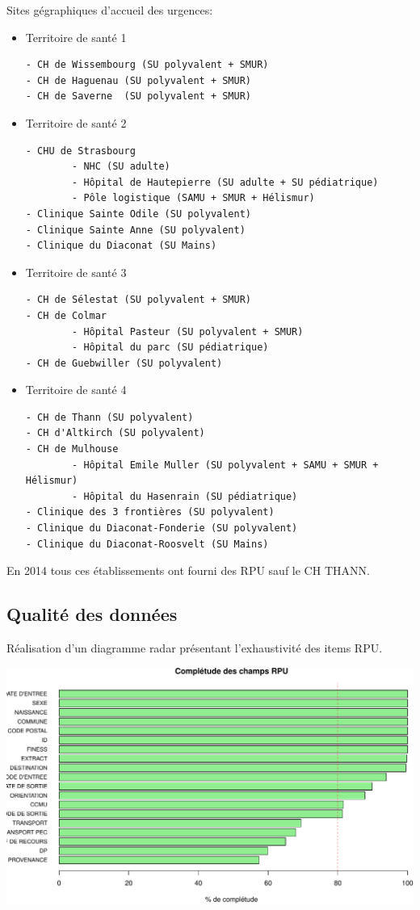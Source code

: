 \documentclass[]{article}
\begin{document}
Sites gégraphiques d'accueil des urgences:

\begin{itemize}
\item
  Territoire de santé 1

\begin{verbatim}
- CH de Wissembourg (SU polyvalent + SMUR)
- CH de Haguenau (SU polyvalent + SMUR)
- CH de Saverne  (SU polyvalent + SMUR)
\end{verbatim}
\item
  Territoire de santé 2

\begin{verbatim}
- CHU de Strasbourg
        - NHC (SU adulte)
        - Hôpital de Hautepierre (SU adulte + SU pédiatrique)
        - Pôle logistique (SAMU + SMUR + Hélismur)
- Clinique Sainte Odile (SU polyvalent)
- Clinique Sainte Anne (SU polyvalent)
- Clinique du Diaconat (SU Mains)
\end{verbatim}
\item
  Territoire de santé 3

\begin{verbatim}
- CH de Sélestat (SU polyvalent + SMUR)
- CH de Colmar 
        - Hôpital Pasteur (SU polyvalent + SMUR)
        - Hôpital du parc (SU pédiatrique)
- CH de Guebwiller (SU polyvalent)
\end{verbatim}
\item
  Territoire de santé 4

\begin{verbatim}
- CH de Thann (SU polyvalent)
- CH d'Altkirch (SU polyvalent)
- CH de Mulhouse
        - Hôpital Emile Muller (SU polyvalent + SAMU + SMUR + Hélismur)
        - Hôpital du Hasenrain (SU pédiatrique)
- Clinique des 3 frontières (SU polyvalent)
- Clinique du Diaconat-Fonderie (SU polyvalent)
- Clinique du Diaconat-Roosvelt (SU Mains)
\end{verbatim}
\end{itemize}

En 2014 tous ces établissements ont fourni des RPU sauf le CH THANN.

\subsection{Qualité des données}\label{qualite-des-donnees}

Réalisation d'un diagramme radar présentant l'exhaustivité des items
RPU.

\includegraphics{rapport2014_V4_files/figure-latex/completude-1.pdf}
\end{document}
